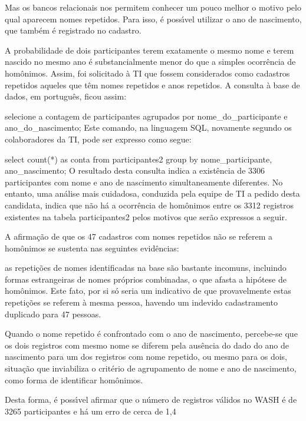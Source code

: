 \documentclass[
12pt,		%
openright,	%
twoside,  %
a4paper,			%
chapter=TITLE,		%
english,			%
french,				%
spanish,			%
brazil				%
]{USPSC-classe/USPSC}
\begin{document}
Mas os bancos relacionais nos permitem conhecer um pouco melhor o motivo pelo qual aparecem nomes repetidos. Para isso, \'e poss\'{\i}vel utilizar o ano de nascimento, que tamb\'em \'e registrado no cadastro.


A probabilidade de dois participantes terem exatamente o mesmo nome e terem nascido no mesmo ano \'e substancialmente menor do que a simples ocorr\^encia de hom\^onimos. Assim, foi solicitado \`a TI que fossem considerados como cadastros repetidos aqueles que t\^em nomes repetidos e anos repetidos. A consulta \`a base de dados, em portugu\^es, ficou assim:


selecione a contagem de participantes agrupados por nome\_do\_participante e ano\_do\_nascimento;
Este comando, na linguagem SQL, novamente segundo os colaboradores da TI, pode ser expresso como segue:


select count(*) as conta from participantes2 group by nome\_participante, ano\_nascimento;
O resultado desta consulta indica a exist\^encia de 3306 participantes com nome e ano de nascimento simultaneamente diferentes. No entanto, uma an\'alise mais cuidadosa, conduzida pela equipe de TI a pedido desta candidata, indica que n\~ao h\'a a ocorr\^encia de hom\^onimos entre os 3312 registros existentes na tabela  participantes2 pelos motivos que ser\~ao expressos a seguir.


A afirma\c{c}\~ao de que os 47 cadastros com nomes repetidos n\~ao se referem a hom\^onimos se sustenta nas seguintes evid\^encias:



\begin{alineas}
\item as repeti\c{c}\~oes de nomes identificadas na base s\~ao bastante incomuns, incluindo formas estrangeiras de nomes pr\'oprios combinadas, o que afasta a hip\'otese de hom\^onimos. Este fato, por si s\'o seria um indicativo de que provavelmente estas repeti\c{c}\~oes se referem \`a mesma pessoa, havendo um indevido cadastramento duplicado para 47 pessoas.
\item Quando o nome repetido \'e confrontado com o ano de nascimento, percebe-se que os dois registros com mesmo nome se diferem pela aus\^encia do dado do ano de nascimento para um dos registros com nome repetido, ou mesmo para os dois, situa\c{c}\~ao que inviabiliza o crit\'erio de agrupamento de nome e ano de nascimento, como forma de identificar hom\^onimos.
\end{alineas}

Desta forma, \'e poss\'{\i}vel afirmar que o n\'umero de registros v\'alidos no WASH \'e de 3265 participantes e h\'a um erro de cerca de 1,4%
\end{document}
